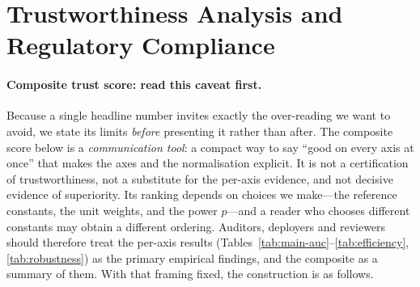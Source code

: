 \documentclass[pdflatex,sn-mathphys-num]{sn-jnl}
\theoremstyle{thmstyleone}%
\theoremstyle{thmstyletwo}%
\theoremstyle{thmstylethree}%
\begin{document}
\begin{table}[t]\centering\small
\caption{Million-node scaling study (ogbn-products, $2.4$M nodes, $123$M
edges, $K{=}3$ clients, $15$ rounds, CPU). $^{\ast}$2026 baseline.
$^{\dagger}$DPD/EOD is a spurious artefact of a collapsed (near-chance)
classifier, not a genuine fairness result---see discussion above. The energy
column is a transparent \emph{proxy}, not a metered measurement: logged
wall-clock $\times$ an assumed $65$\,W CPU draw (\texttt{src/trust/
sustainability.py}), valid for relative comparison between methods on this one
machine and not comparable across hardware.}
\label{tab:large-scale}

\end{table}

\begin{table}[t]\centering\small
\caption{Calibration, uncertainty, and efficiency (Bail). ECE and Brier
(lower better), group uncertainty gap, and per-round communication. Energy is
\emph{not} reported here: wall-clock was not logged for these canonical
small-graph runs, so the proxy of Section~\ref{sec:method-trust} has no input
for them. We report it instead where the measurement exists, on the large-scale
study (Table~\ref{tab:large-scale}), rather than print an uninformative zero.}
\label{tab:efficiency}

\end{table}

\section{Trustworthiness Analysis and Regulatory Compliance}
\label{sec:trust}

\paragraph{Composite trust score: read this caveat first.}
Because a single headline number invites exactly the over-reading we want to
avoid, we state its limits \emph{before} presenting it rather than after. The
composite score below is a \emph{communication tool}: a compact way to say
``good on every axis at once'' that makes the axes and the normalisation
explicit. It is not a certification of trustworthiness, not a substitute for the
per-axis evidence, and not decisive evidence of superiority. Its ranking depends
on choices we make---the reference constants, the unit weights, and the power
$p$---and a reader who chooses different constants may obtain a different
ordering. Auditors, deployers and reviewers should therefore treat the per-axis
results (Tables~\ref{tab:main-auc}--\ref{tab:efficiency},
\ref{tab:robustness}) as the primary empirical findings, and the composite as a
summary of them. With that framing fixed, the construction is as follows.
\end{document}
